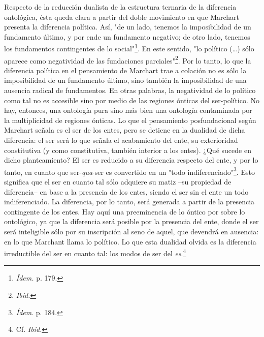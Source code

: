 \documentclass{book}
\begin{document}
Respecto de la reducción dualista de la estructura ternaria de la
diferencia ontológica, ésta queda clara a partir del doble movimiento en
que Marchart presenta la diferencia política. Así, "de un lado, tenemos
la imposibilidad de un fundamento último, y por ende un fundamento
negativo; de otro lado, tenemos los fundamentos contingentes de lo
social"\footnote{\emph{Ídem.} p. 179.}. En este sentido, "lo político
(\dots) sólo aparece como negatividad de las fundaciones
parciales"\footnote{\emph{Ibíd.}}. Por lo tanto, lo que la diferencia
política en el pensamiento de Marchart trae a colación no es sólo la
imposibilidad de un fundamento último, sino también la imposibilidad de
una ausencia radical de fundamentos. En otras palabras, la negatividad
de lo político como tal no es accesible sino por medio de las regiones
ónticas del ser-político. No hay, entonces, una ontología pura sino más
bien una ontología contaminada por la multiplicidad de regiones ónticas.
Lo que el pensamiento posfundacional según Marchart señala es el ser de
los entes, pero se detiene en la dualidad de dicha diferencia: el ser
será lo que señala el acabamiento del ente, su exterioridad constitutiva
(y como constitutiva, también interior a los entes). ¿Qué sucede en
dicho planteamiento? El ser es reducido a su diferencia respecto del
ente, y por lo tanto, en cuanto que ser-\emph{qua}-ser es convertido en
un "todo indiferenciado"\footnote{\emph{Ídem}. p. 184.}. Esto significa
que el ser en cuanto tal sólo adquiere su matiz --su propiedad de
diferencia-- en base a la presencia de los entes, siendo el ser sin el
ente un todo indiferenciado. La diferencia, por lo tanto, será generada
a partir de la presencia contingente de los entes. Hay aquí una
preeminencia de lo óntico por sobre lo ontológico, ya que la diferencia
será posible por la presencia del ente, donde el ser será inteligible
sólo por su inscripción al seno de aquel, que devendrá en ausencia: en
lo que Marchant llama lo político. Lo que esta dualidad olvida es la
diferencia irreductible del ser en cuanto tal: los modos de ser del
\emph{es}.\footnote{Cf. \emph{Ibíd.}}
\end{document}
